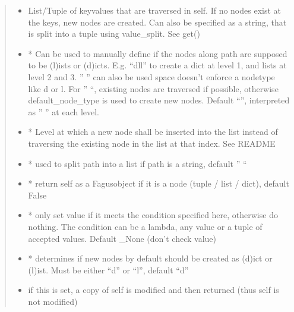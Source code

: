 \documentclass[a4paper,10pt,english]{sphinxmanual}
\begin{document}
\begin{fulllineitems}
\begin{fulllineitems}
\begin{quote}
\begin{description}
\begin{itemize}
\item {}
\sphinxAtStartPar
{} \textendash{} List/Tuple of key\sphinxhyphen{}values that are traversed in self. If no nodes exist at the keys, new nodes are
created. Can also be specified as a string, that is split into a tuple using value\_split. See get()

\item {}
\sphinxAtStartPar
{} \textendash{} * Can be used to manually define if the nodes along path are supposed to be (l)ists or
(d)icts. E.g. “dll” to create a dict at level 1, and lists at level 2 and 3. ” ” can also be used \sphinxhyphen{}
space doesn’t enforce a node\sphinxhyphen{}type like d or l. For ” “, existing nodes are traversed if possible,
otherwise default\_node\_type is used to create new nodes. Default “”, interpreted as ” ” at each level.

\item {}
\sphinxAtStartPar
{} \textendash{} * Level at which a new node shall be inserted into the list instead of traversing the
existing node in the list at that index. See README

\item {}
\sphinxAtStartPar
{} \textendash{} * used to split path into a list if path is a string, default ” “

\item {}
\sphinxAtStartPar
{} \textendash{} * return self as a Fagus\sphinxhyphen{}object if it is a node (tuple / list / dict), default False

\item {}
\sphinxAtStartPar
{} \textendash{} * only set value if it meets the condition specified here, otherwise do nothing. The condition can be
a lambda, any value or a tuple of accepted values. Default \_None (don’t check value)

\item {}
\sphinxAtStartPar
{} \textendash{} * determines if new nodes by default should be created as (d)ict or (l)ist. Must be
either “d” or “l”, default “d”

\item {}
\sphinxAtStartPar
{} \textendash{} if this is set, a copy of self is modified and then returned (thus self is not modified)


\end{itemize}
\end{description}
\end{quote}
\end{fulllineitems}
\end{fulllineitems}
\end{document}
